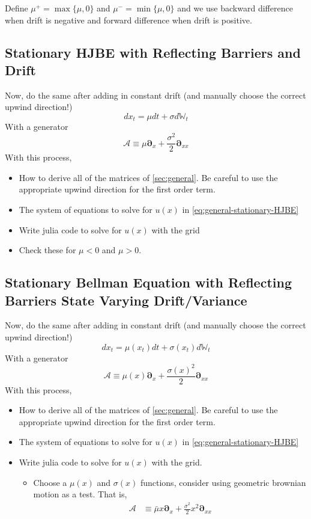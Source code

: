 \documentclass[11pt]{article}
\newcommand{\D}[1][]{\ensuremath{\boldsymbol{\partial}_{#1}}}
\newcommand{\W}{\ensuremath{\mathbb{W}}}
\newcommand{\A}{\ensuremath{\mathcal{A}}}
\begin{document}
Define $\mu^{+} = \max\{\mu, 0\}$ and $\mu^{-} = \min\{\mu, 0\}$ and we use backward difference when drift is negative and forward difference when drift is positive.


\subsection{Stationary HJBE with Reflecting Barriers and Drift}
Now, do the same after adding in constant drift (and manually choose the correct upwind direction!)
$$
d x_t = \mu dt + \sigma d\W_t
$$
With a generator
$$
	\A \equiv \mu \D[x] + \frac{\sigma^2}{2}\D[xx]
$$
With this process,
\begin{itemize}
	\item How to derive all of the matrices of \cref{sec:general}.  Be careful to use the appropriate upwind direction for the first order term.
	\item The system of equations to solve for $u(x)$ in \cref{eq:general-stationary-HJBE}
	\item Write julia code to solve for $u(x)$ with the grid
	\item Check these for $\mu < 0$ and $\mu > 0$.
\end{itemize}



\subsection{Stationary Bellman Equation with Reflecting Barriers State Varying Drift/Variance}
Now, do the same after adding in constant drift (and manually choose the correct upwind direction!)
$$
d x_t = \mu(x_t) dt + \sigma(x_t) d\W_t
$$
With a generator
$$
\A \equiv \mu(x) \D[x] + \frac{\sigma(x)^2}{2}\D[xx]
$$
With this process,
\begin{itemize}
	\item How to derive all of the matrices of \cref{sec:general}.  Be careful to use the appropriate upwind direction for the first order term.
	\item The system of equations to solve for $u(x)$ in \cref{eq:general-stationary-HJBE}
	\item Write julia code to solve for $u(x)$ with the grid.
	\begin{itemize}
		\item Choose a $\mu(x)$ and $\sigma(x)$ functions, consider using geometric brownian motion as a test.  That is,
		\begin{align}
			\A &\equiv \bar{\mu} x \D[x] + \frac{\bar{\sigma}^2}{2}x^2\D[xx]
		\end{align}
	\end{itemize}
\end{itemize}
\end{document}
